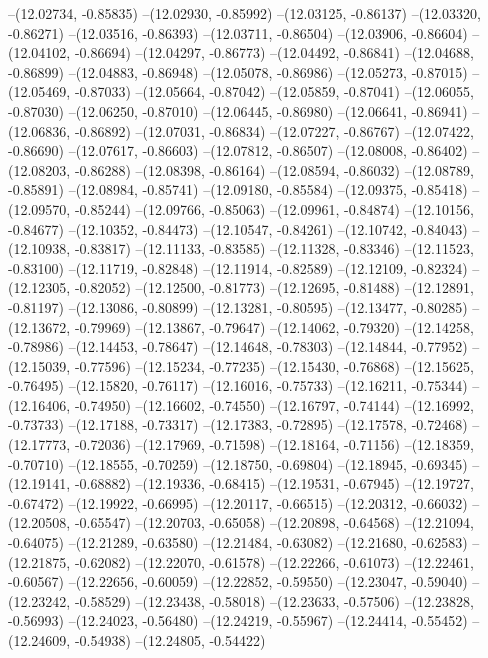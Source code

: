 --(12.02734, -0.85835)
--(12.02930, -0.85992)
--(12.03125, -0.86137)
--(12.03320, -0.86271)
--(12.03516, -0.86393)
--(12.03711, -0.86504)
--(12.03906, -0.86604)
--(12.04102, -0.86694)
--(12.04297, -0.86773)
--(12.04492, -0.86841)
--(12.04688, -0.86899)
--(12.04883, -0.86948)
--(12.05078, -0.86986)
--(12.05273, -0.87015)
--(12.05469, -0.87033)
--(12.05664, -0.87042)
--(12.05859, -0.87041)
--(12.06055, -0.87030)
--(12.06250, -0.87010)
--(12.06445, -0.86980)
--(12.06641, -0.86941)
--(12.06836, -0.86892)
--(12.07031, -0.86834)
--(12.07227, -0.86767)
--(12.07422, -0.86690)
--(12.07617, -0.86603)
--(12.07812, -0.86507)
--(12.08008, -0.86402)
--(12.08203, -0.86288)
--(12.08398, -0.86164)
--(12.08594, -0.86032)
--(12.08789, -0.85891)
--(12.08984, -0.85741)
--(12.09180, -0.85584)
--(12.09375, -0.85418)
--(12.09570, -0.85244)
--(12.09766, -0.85063)
--(12.09961, -0.84874)
--(12.10156, -0.84677)
--(12.10352, -0.84473)
--(12.10547, -0.84261)
--(12.10742, -0.84043)
--(12.10938, -0.83817)
--(12.11133, -0.83585)
--(12.11328, -0.83346)
--(12.11523, -0.83100)
--(12.11719, -0.82848)
--(12.11914, -0.82589)
--(12.12109, -0.82324)
--(12.12305, -0.82052)
--(12.12500, -0.81773)
--(12.12695, -0.81488)
--(12.12891, -0.81197)
--(12.13086, -0.80899)
--(12.13281, -0.80595)
--(12.13477, -0.80285)
--(12.13672, -0.79969)
--(12.13867, -0.79647)
--(12.14062, -0.79320)
--(12.14258, -0.78986)
--(12.14453, -0.78647)
--(12.14648, -0.78303)
--(12.14844, -0.77952)
--(12.15039, -0.77596)
--(12.15234, -0.77235)
--(12.15430, -0.76868)
--(12.15625, -0.76495)
--(12.15820, -0.76117)
--(12.16016, -0.75733)
--(12.16211, -0.75344)
--(12.16406, -0.74950)
--(12.16602, -0.74550)
--(12.16797, -0.74144)
--(12.16992, -0.73733)
--(12.17188, -0.73317)
--(12.17383, -0.72895)
--(12.17578, -0.72468)
--(12.17773, -0.72036)
--(12.17969, -0.71598)
--(12.18164, -0.71156)
--(12.18359, -0.70710)
--(12.18555, -0.70259)
--(12.18750, -0.69804)
--(12.18945, -0.69345)
--(12.19141, -0.68882)
--(12.19336, -0.68415)
--(12.19531, -0.67945)
--(12.19727, -0.67472)
--(12.19922, -0.66995)
--(12.20117, -0.66515)
--(12.20312, -0.66032)
--(12.20508, -0.65547)
--(12.20703, -0.65058)
--(12.20898, -0.64568)
--(12.21094, -0.64075)
--(12.21289, -0.63580)
--(12.21484, -0.63082)
--(12.21680, -0.62583)
--(12.21875, -0.62082)
--(12.22070, -0.61578)
--(12.22266, -0.61073)
--(12.22461, -0.60567)
--(12.22656, -0.60059)
--(12.22852, -0.59550)
--(12.23047, -0.59040)
--(12.23242, -0.58529)
--(12.23438, -0.58018)
--(12.23633, -0.57506)
--(12.23828, -0.56993)
--(12.24023, -0.56480)
--(12.24219, -0.55967)
--(12.24414, -0.55452)
--(12.24609, -0.54938)
--(12.24805, -0.54422)

